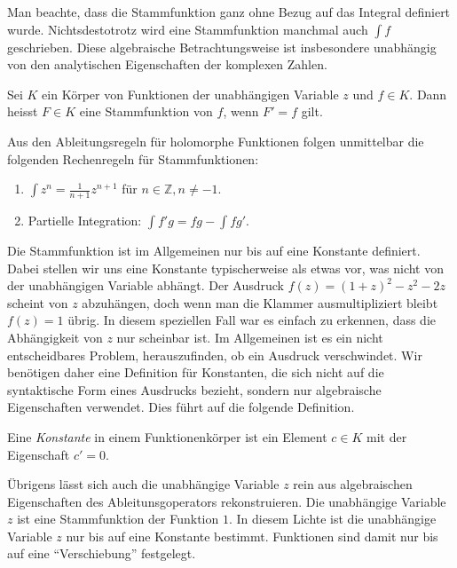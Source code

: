 Man beachte, dass die Stammfunktion ganz ohne Bezug auf das
Integral definiert wurde.
Nichtsdestotrotz wird eine Stammfunktion manchmal auch $\int f$
geschrieben.
Diese algebraische Betrachtungsweise ist insbesondere unabhängig
von den analytischen Eigenschaften der komplexen Zahlen.

\begin{definition}
Sei $K$ ein Körper von Funktionen der unabhängigen Variable $z$ und
$f\in K$.
Dann heisst $F\in K$ eine Stammfunktion von $f$, wenn $F'=f$ gilt.
\end{definition}

Aus den Ableitungsregeln für holomorphe Funktionen folgen unmittelbar
die folgenden Rechenregeln für Stammfunktionen:
\begin{enumerate}
\item
\(\displaystyle
\int z^n = \frac{1}{n+1} z^{n+1}
\)
für $n\in\mathbb{Z}, n\ne -1$.
\item Partielle Integration:
\(\displaystyle
\int f'g
=
fg
-
\int fg'.
\)
\end{enumerate}

Die Stammfunktion ist im Allgemeinen nur bis auf eine Konstante
definiert.
Dabei stellen wir uns eine Konstante typischerweise als etwas
vor, was nicht von der unabhängigen Variable abhängt.
Der Ausdruck $f(z)=(1+z)^2-z^2-2z$ scheint von $z$ abzuhängen,
doch wenn man die Klammer ausmultipliziert bleibt $f(z)=1$ übrig.
In diesem speziellen Fall war es einfach zu erkennen, dass die Abhängigkeit
von $z$ nur scheinbar ist.
Im Allgemeinen ist es ein nicht entscheidbares Problem, herauszufinden,
ob ein Ausdruck verschwindet.
Wir benötigen daher eine Definition für Konstanten, die sich nicht
auf die syntaktische Form eines Ausdrucks bezieht, sondern nur 
algebraische Eigenschaften verwendet.
Dies führt auf die folgende Definition.

\begin{definition}[Konstante]
Eine \emph{Konstante} in einem Funktionenkörper ist ein Element $c\in K$
%
mit der Eigenschaft $c'=0$.
\end{definition}

Übrigens lässt sich auch die unabhängige Variable $z$ rein aus
algebraischen Eigenschaften des Ableitunsgoperators rekonstruieren.
Die unabhängige Variable $z$ ist eine Stammfunktion der Funktion $1$.
In diesem Lichte ist die unabhängige Variable $z$ nur bis auf eine
Konstante bestimmt.
Funktionen sind damit nur bis auf eine ``Verschiebung'' festgelegt.


